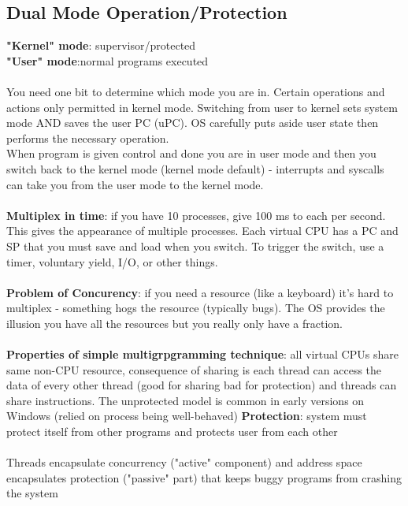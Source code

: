 \documentclass{article}
\begin{document}
\subsection{Dual Mode Operation/Protection}
\textbf{"Kernel" mode}: supervisor/protected \\
\textbf{"User" mode}:normal programs executed \\ \\ 
You need one bit to determine which mode you are in. Certain operations and actions only permitted in kernel mode. Switching from user to kernel sets system mode AND saves the user PC (uPC). OS carefully puts aside user state then performs the necessary operation. \\
When program is given control and done you are in user mode and then you switch back to the kernel mode (kernel mode default) - interrupts and syscalls can take you from the user mode to the kernel mode. \\ \\ 
\textbf{Multiplex in time}: if you have 10 processes, give 100 ms to each per second. This gives the appearance of multiple processes. Each virtual CPU has a PC and SP that you must save and load when you switch. To trigger the switch, use a timer, voluntary yield, I/O, or other things. \\ \\ 
\textbf{Problem of Concurency}: if you need a resource (like a keyboard) it's hard to multiplex - something hogs the resource (typically bugs). The OS provides the illusion you have all the resources but you really only have a fraction. \\ \\
\textbf{Properties of simple multigrpgramming technique}: all virtual CPUs share same non-CPU resource, consequence of sharing is each thread can access the data of every other thread (good for sharing bad for protection) and threads can share instructions. The unprotected model is common in early versions on Windows (relied on process being well-behaved)
\textbf{Protection}: system must protect itself from other programs and protects user from each other \\ \\
Threads encapsulate concurrency ("active" component) and address space encapsulates protection ("passive" part) that keeps buggy programs from crashing the system
\end{document}
